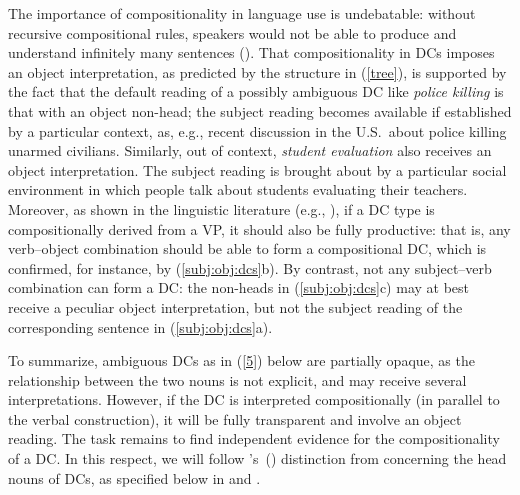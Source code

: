 \documentclass[output=paper]{langsci/langscibook}
\begin{document}
 The importance of compositionality in language use is undebatable: without recursive compositional rules, speakers would not be able to produce and understand infinitely many sentences (\cite{dowty:07}). That compositionality in DCs imposes an object interpretation, as predicted by the structure in (\ref{tree}), is supported by the fact that the default reading of a possibly ambiguous DC like \textit{police killing} is that with an object non-head; the subject reading becomes available if established by a particular context, as, e.g., recent discussion in the U.S.\ about police killing unarmed civilians. Similarly, out of context, \textit{student evaluation} also receives an object interpretation. The subject reading is brought about by a particular social environment in which people talk about students evaluating their teachers. Moreover, as shown in the linguistic literature (e.g., \cite{grimshaw:90,borer:13,iordachioaia:alexiadou:pairamidis:17}), if a DC type is  compositionally derived from a VP, it should also be fully productive: that is, any verb--object combination should be able to form a compositional DC, which is confirmed, for instance, by (\ref{subj:obj:dcs}b). By contrast, not any subject--verb combination can form a DC: the non-heads in  (\ref{subj:obj:dcs}c) may at best receive a peculiar object interpretation, but not the subject reading of the corresponding sentence in (\ref{subj:obj:dcs}a).

\begin{exe}
\end{exe}


To summarize, ambiguous DCs as in (\ref{5}) below are partially opaque, as the relationship between the two nouns is not explicit, and may receive several interpretations.
However, if the DC is interpreted compositionally (in parallel to the verbal construction), it will be fully transparent and involve an object reading. The task remains to find independent evidence for the compositionality of a DC. In this respect, we will follow \citeauthor{grimshaw:90}'s~(\citeyear{grimshaw:90}) distinction from  concerning the head nouns of DCs, as specified below in  and .
\end{document}
